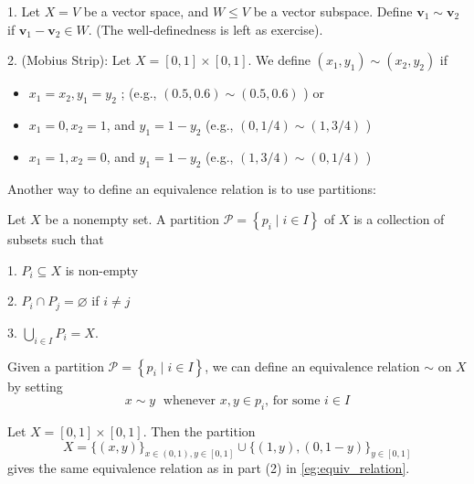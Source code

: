 \begin{example} \label{eg:equiv_relation} 1. Let \(X = V\) be a vector space, and \(W \leq  V\) be a vector subspace. Define \({\mathbf{v}}_{1} \sim  {\mathbf{v}}_{2}\) if \({\mathbf{v}}_{1} - {\mathbf{v}}_{2} \in  W\).
(The well-definedness is left as exercise).

2. (Mobius Strip): Let \(X = \left\lbrack  {0,1}\right\rbrack   \times  \left\lbrack  {0,1}\right\rbrack\). We define \(\left( {{x}_{1},{y}_{1}}\right)  \sim  \left( {{x}_{2},{y}_{2}}\right)\) if

\begin{itemize}
\item \({x}_{1} = {x}_{2},{y}_{1} = {y}_{2}\) ; (e.g., \(\left( {{0.5},{0.6}}\right)  \sim  \left( {{0.5},{0.6}}\right)\) ) or
\end{itemize}

\begin{itemize}
\item \({x}_{1} = 0,{x}_{2} = 1\), and \({y}_{1} = 1 - {y}_{2}\) (e.g., \(\left( {0,1/4}\right)  \sim  \left( {1,3/4}\right)\) )
\end{itemize}

\begin{itemize}
\item \({x}_{1} = 1,{x}_{2} = 0\), and \({y}_{1} = 1 - {y}_{2}\) (e.g., \(\left( {1,3/4}\right)  \sim  \left( {0,1/4}\right)\) )
\end{itemize}
\end{example}

Another way to define an equivalence relation is to use partitions:
\begin{definition}[Partition] Let \(X\) be a nonempty set. A partition \(\mathcal{P} = \left\{  {{p}_{i} \mid  i \in  I}\right\}\) of \(X\) is a collection of subsets such that

1. \({P}_{i} \subseteq  X\) is non-empty

2. \({P}_{i} \cap  {P}_{j} = \varnothing\) if \(i \neq  j\)

3. \(\mathop{\bigcup }\limits_{{i \in  I}}{P}_{i} = X\).

Given a partition \(\mathcal{P} = \left\{  {{p}_{i} \mid  i \in  I}\right\}\), we can define an equivalence relation \(\sim\) on \(X\) by setting
\[
x \sim  y\;\text{ whenever }x,y \in  {p}_{i}\text{, for some }i \in  I
\]
\end{definition}
\begin{example}
Let \(X = \left\lbrack  {0,1}\right\rbrack   \times  \left\lbrack  {0,1}\right\rbrack\).
Then the partition 
\[
X = \{ \left( {x,y}\right) {\} }_{x \in  \left( {0,1}\right),y \in  \left\lbrack  {0,1}\right\rbrack  } \cup  \{ \left( {1,y}\right),\left( {0,1 - y}\right) {\} }_{y \in  \left\lbrack  {0,1}\right\rbrack  }
\]
gives the same equivalence relation as in part (2) in \autoref{eg:equiv_relation}.    
\end{example}

